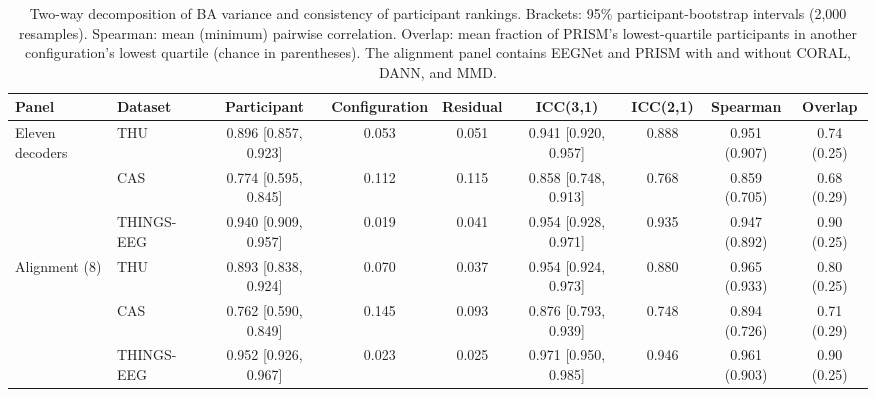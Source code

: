 \begin{table}[H]
\centering
\caption{Two-way decomposition of BA variance and consistency of participant rankings. Brackets: 95\% participant-bootstrap intervals (2{,}000 resamples). Spearman: mean (minimum) pairwise correlation. Overlap: mean fraction of PRISM's lowest-quartile participants in another configuration's lowest quartile (chance in parentheses). The alignment panel contains EEGNet and PRISM with and without CORAL, DANN, and MMD.}
\label{tab:supp-userbound}
\scriptsize
\begin{adjustbox}{max width=\textwidth}
\begin{tabular}{@{}llccccccc@{}}
\toprule
Panel & Dataset & Participant & Configuration & Residual & ICC(3,1) & ICC(2,1) & Spearman & Overlap \\
\midrule
Eleven decoders & THU & 0.896 [0.857, 0.923] & 0.053 & 0.051 & 0.941 [0.920, 0.957] & 0.888 & 0.951 (0.907) & 0.74 (0.25) \\
 & CAS & 0.774 [0.595, 0.845] & 0.112 & 0.115 & 0.858 [0.748, 0.913] & 0.768 & 0.859 (0.705) & 0.68 (0.29) \\
 & THINGS-EEG & 0.940 [0.909, 0.957] & 0.019 & 0.041 & 0.954 [0.928, 0.971] & 0.935 & 0.947 (0.892) & 0.90 (0.25) \\
\midrule
Alignment (8) & THU & 0.893 [0.838, 0.924] & 0.070 & 0.037 & 0.954 [0.924, 0.973] & 0.880 & 0.965 (0.933) & 0.80 (0.25) \\
 & CAS & 0.762 [0.590, 0.849] & 0.145 & 0.093 & 0.876 [0.793, 0.939] & 0.748 & 0.894 (0.726) & 0.71 (0.29) \\
 & THINGS-EEG & 0.952 [0.926, 0.967] & 0.023 & 0.025 & 0.971 [0.950, 0.985] & 0.946 & 0.961 (0.903) & 0.90 (0.25) \\
\bottomrule
\end{tabular}
\end{adjustbox}
\end{table}
